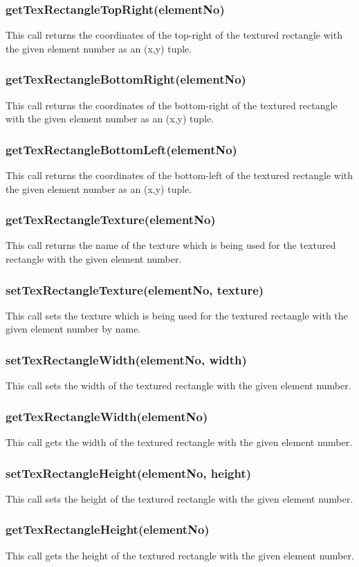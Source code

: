 \documentclass{acm_proc_article-sp}
\begin{document}
\subsubsection{getTexRectangleTopRight(elementNo)}
This call returns the coordinates of the top-right of the textured rectangle with the given element number as an (x,y) tuple.
\subsubsection{getTexRectangleBottomRight(elementNo)}
This call returns the coordinates of the bottom-right of the textured rectangle with the given element number as an (x,y) tuple.
\subsubsection{getTexRectangleBottomLeft(elementNo)}
This call returns the coordinates of the bottom-left of the textured rectangle with the given element number as an (x,y) tuple.
\subsubsection{getTexRectangleTexture(elementNo)}
This call returns the name of the texture which is being used for the textured rectangle with the given element number.
\subsubsection{setTexRectangleTexture(elementNo, texture)}
This call sets the texture which is being used for the textured rectangle with the given element number by name.
\subsubsection{setTexRectangleWidth(elementNo, width)}
This call sets the width of the textured rectangle with the given element number.
\subsubsection{getTexRectangleWidth(elementNo)}
This call gets the width of the textured rectangle with the given element number.
\subsubsection{setTexRectangleHeight(elementNo, height)}
This call sets the height of the textured rectangle with the given element number.
\subsubsection{getTexRectangleHeight(elementNo)}
This call gets the height of the textured rectangle with the given element number.
\end{document}
